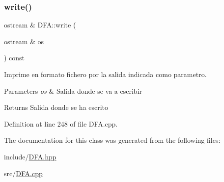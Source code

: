 \subsubsection{\texorpdfstring{write()}{write()}\hspace{0.1cm}{\footnotesize\ttfamily [2/2]}}
{\footnotesize\ttfamily ostream \& D\+F\+A\+::write (\begin{DoxyParamCaption}\item[{ostream \&}]{os }\end{DoxyParamCaption}) const}



Imprime en formato fichero por la salida indicada como parametro. 


\begin{DoxyParams}{Parameters}
{\em os} & Salida donde se va a escribir \\
\hline
\end{DoxyParams}
\begin{DoxyReturn}{Returns}
Salida donde se ha escrito 
\end{DoxyReturn}


Definition at line 248 of file D\+F\+A.\+cpp.



The documentation for this class was generated from the following files\+:\begin{DoxyCompactItemize}
\item 
include/\hyperlink{_d_f_a_8hpp}{D\+F\+A.\+hpp}\item 
src/\hyperlink{_d_f_a_8cpp}{D\+F\+A.\+cpp}\end{DoxyCompactItemize}
